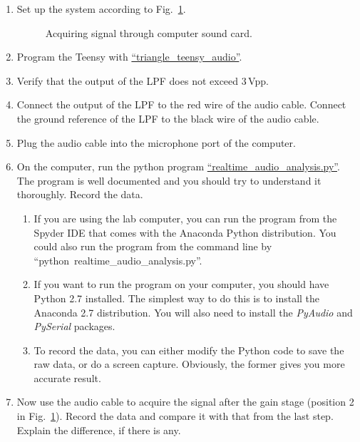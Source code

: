 \documentclass[letterpaper, 11pt]{article}
\begin{document}
\begin{enumerate}
	\item Set up the system according to Fig.~\ref{fig:audio-1}.
		\begin{figure}[h]
			\caption{Acquiring signal through computer sound card.}
			\label{fig:audio-1}
		\end{figure}

	\item Program the Teensy with \href{https://github.com/ucdart/UCD-EEC134/blob/master/labs/lab1/code/triangle_teensy_audio/triangle_teensy_audio.ino}{``triangle\_teensy\_audio''}. 
	
	\item Verify that the output of the LPF does not exceed 3\,Vpp. 	

	\item Connect the output of the LPF to the red wire of the audio cable. Connect the ground reference of the LPF to the black wire of the audio cable. 
	
	\item Plug the audio cable into the microphone port of the computer.
	
	\item On the computer, run the python program \href{https://github.com/ucdart/UCD-EEC134/blob/master/labs/lab1/code/realtime_audio_analysis.py}{``realtime\_audio\_analysis.py''}. The program is well documented and you should try to understand it thoroughly. Record the data. 
		\begin{enumerate}
			\item If you are using the lab computer, you can run the program from the Spyder IDE that comes with the Anaconda Python distribution. You could also run the program from the command line by ``python~realtime\_audio\_analysis.py''. 
			
			\item If you want to run the program on your computer, you should have Python 2.7 installed. The simplest way to do this is to install the Anaconda 2.7 distribution. You will also need to install the \textit{PyAudio} and \textit{PySerial} packages. 
			
			\item To record the data, you can either modify the Python code to save the raw data, or do a screen capture. Obviously, the former gives you more accurate result. 
		\end{enumerate}
	
	\item Now use the audio cable to acquire the signal after the gain stage (position 2 in Fig.~\ref{fig:audio-1}). Record the data and compare it with that from the last step. Explain the difference, if there is any. 
\end{enumerate}
\end{document}
